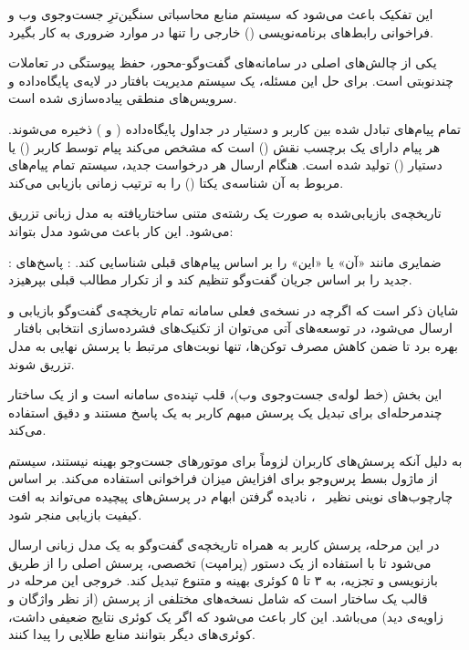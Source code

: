 این تفکیک باعث می‌شود که سیستم منابع محاسباتی سنگین‌ترِ جست‌وجوی وب و فراخوانی رابط‌های برنامه‌نویسی () خارجی را تنها در موارد ضروری به کار بگیرد.


یکی از چالش‌های اصلی در سامانه‌های گفت‌وگو-محور، حفظ پیوستگی در تعاملات چندنوبتی است. برای حل این مسئله، یک سیستم مدیریت بافتار در لایه‌ی پایگاه‌داده و سرویس‌های منطقی پیاده‌سازی شده است.

تمام پیام‌های تبادل شده بین کاربر و دستیار در جداول پایگاه‌داده ( و ) ذخیره می‌شوند. هر پیام دارای یک برچسب نقش () است که مشخص می‌کند پیام توسط کاربر () یا دستیار () تولید شده است. هنگام ارسال هر درخواست جدید، سیستم تمام پیام‌های مربوط به آن شناسه‌ی یکتا () را به ترتیب زمانی بازیابی می‌کند. 

تاریخچه‌ی بازیابی‌شده به صورت یک رشته‌ی متنی ساختاریافته به مدل زبانی تزریق می‌شود. این کار باعث می‌شود مدل بتواند:

 : ضمایری مانند «آن» یا «این» را بر اساس پیام‌های قبلی شناسایی کند.
 : پاسخ‌های جدید را بر اساس جریان گفت‌وگو تنظیم کند و از تکرار مطالب قبلی بپرهیزد.

شایان ذکر است که اگرچه در نسخه‌ی فعلی سامانه تمام تاریخچه‌ی گفت‌وگو بازیابی و ارسال می‌شود، در توسعه‌های آتی می‌توان از تکنیک‌های فشرده‌سازی انتخابی بافتار~ بهره برد تا ضمن کاهش مصرف توکن‌ها، تنها نوبت‌های مرتبط با پرسش نهایی به مدل تزریق شوند.


این بخش (خط لوله‌ی جست‌وجوی وب)، قلب تپنده‌ی سامانه است و از یک ساختار چندمرحله‌ای برای تبدیل یک پرسش مبهم کاربر به یک پاسخ مستند و دقیق استفاده می‌کند.

به دلیل آنکه پرسش‌های کاربران لزوماً برای موتورهای جست‌وجو بهینه نیستند، سیستم از ماژول بسط پرس‌وجو برای افزایش میزان فراخوانی استفاده می‌کند. بر اساس چارچوب‌های نوینی نظیر ~، نادیده گرفتن ابهام در پرسش‌های پیچیده می‌تواند به افت کیفیت بازیابی منجر شود.

در این مرحله، پرسش کاربر به همراه تاریخچه‌ی گفت‌وگو به یک مدل زبانی ارسال می‌شود تا با استفاده از یک دستور (پرامپت) تخصصی، پرسش اصلی را از طریق بازنویسی و تجزیه، به ۳ تا ۵ کوئری بهینه و متنوع تبدیل کند. خروجی این مرحله در قالب یک ساختار  است که شامل نسخه‌های مختلفی از پرسش (از نظر واژگان و زاویه‌ی دید) می‌باشد. این کار باعث می‌شود که اگر یک کوئری نتایج ضعیفی داشت، کوئری‌های دیگر بتوانند منابع طلایی را پیدا کنند.

